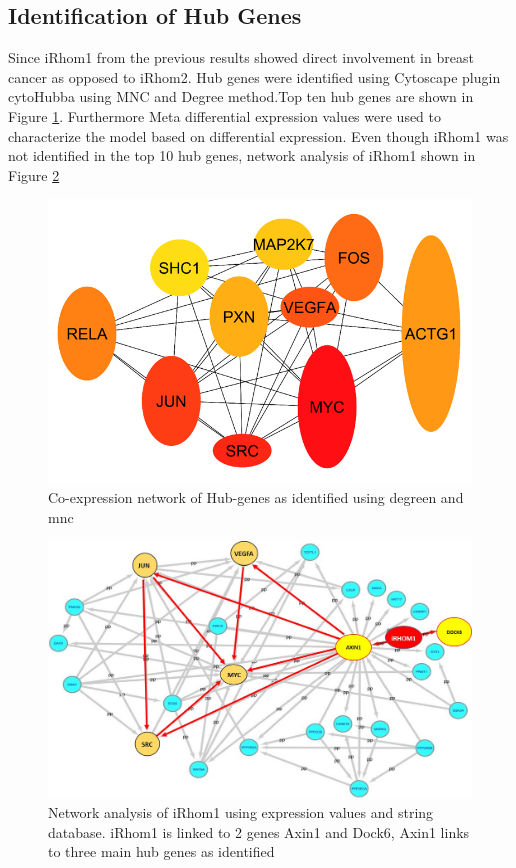 \documentclass[fleqn,10pt,lineno]{wlpeerj}
\begin{document}
\subsection*{Identification of Hub Genes}
Since iRhom1 from the previous results showed direct involvement in breast cancer as opposed to iRhom2. Hub genes were identified using Cytoscape plugin cytoHubba using MNC and Degree method.Top ten hub genes are shown in Figure \ref{fig:hub-genes}.  Furthermore Meta differential expression values were used to characterize the model based on differential expression. Even though iRhom1 was not identified in the top 10 hub genes, network analysis of iRhom1 shown in Figure \ref{fig:network-irhom1}
\begin{figure}[ht]
\centering
\includegraphics[width=\linewidth]{hub-genes.png}
\caption{Co-expression network of Hub-genes as identified using degreen and mnc}
\label{fig:hub-genes}
\end{figure}

\begin{figure}[ht]
\centering
\includegraphics[width=\linewidth]{network.jpg}
\caption{Network analysis of iRhom1 using expression values and string database. iRhom1 is linked to 2 genes Axin1 and Dock6, Axin1 links to three main hub genes as identified }
\label{fig:network-irhom1}
\end{figure}
\end{document}
